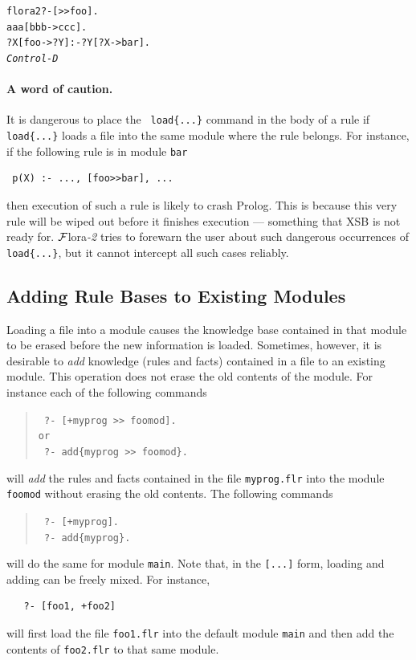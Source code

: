 \documentclass[11pt]{article}
\newcommand{\FLSYSTEM}{{\mbox{\sc ${\cal F}${lora}\rm\emph{-2}}}\xspace}
\newcommand{\prompt}{flora2 ?- }
\newcommand{\flrext}{flr}
\begin{document}
\begin{alltt}
 \prompt [>{}>foo].
 aaa[bbb->ccc].
 ?X[foo->?Y] :- ?Y[?X->bar].
 \emph{Control-D}  
\end{alltt}


\paragraph{A word of caution.} It is dangerous to place the {\tt
  load\{...\}} command
in the body of a rule if {\tt load\{...\}} loads a file into the same module
where the rule belongs. For instance, if the following rule is in module
{\tt bar}  
\begin{verbatim}
 p(X) :- ..., [foo>>bar], ...  
\end{verbatim}
then execution of such a rule is likely to crash Prolog. This is because
this very rule will be wiped out before it finishes execution --- something
that XSB is not ready for. \FLSYSTEM tries to forewarn the user about such
dangerous occurrences of {\tt load\{...\}}, but it cannot intercept all such
cases reliably.


\subsection{Adding Rule Bases to Existing Modules}

Loading a file into a module causes the knowledge base contained in that
module to be erased before the new information is loaded. Sometimes,
however, it is desirable to \emph{add} knowledge (rules and facts)
contained in a file to an existing module.
This operation does not erase the old contents of the module.
For instance each of the following commands 

\index{[+file]}
\begin{quote}
  \tt
   ?- [+myprog >{}> foomod].\\
   or
   \\
    \tt
   ?- add\{myprog >{}> foomod\}.
\end{quote}
will \emph{add} the rules and facts contained in the file {\tt myprog.\flrext} into the
module {\tt foomod} without erasing the old contents. The following commands
\begin{quote}
  \tt
   ?- [+myprog].\\
    \tt
   ?- add\{myprog\}.
\end{quote}
will do the same for module {\tt main}. Note that, in the {\tt [...]} form,  
loading and adding can be freely mixed. For instance, 
\begin{verbatim}
   ?- [foo1, +foo2]  
\end{verbatim}
will first load the file {\tt foo1.\flrext} into the default module {\tt main}
and then add the contents of {\tt foo2.\flrext} to that same module.
\end{document}
